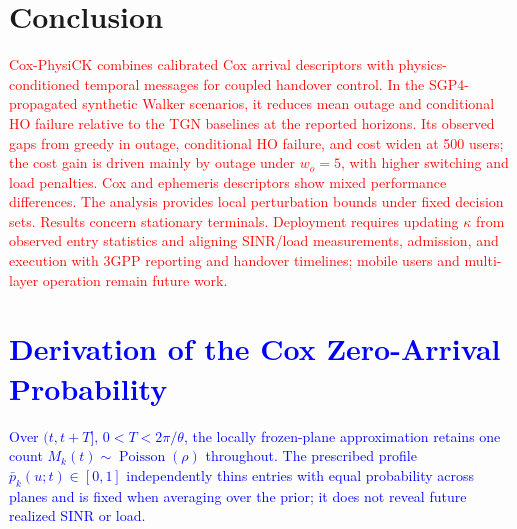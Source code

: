 \documentclass[10pt,letterpaper,journal]{IEEEtran}
\newcommand{\revnew}[1]{\textcolor{red}{#1}}
\begin{document}
\noindent\begin{minipage}{\columnwidth}
\section{Conclusion}
\label{sec:conclusion}
\revnew{Cox-PhysiCK combines calibrated Cox arrival descriptors with physics-conditioned temporal messages for coupled handover control. In the SGP4-propagated synthetic Walker scenarios, it reduces mean outage and conditional HO failure relative to the TGN baselines at the reported horizons. Its observed gaps from greedy in outage, conditional HO failure, and cost widen at 500 users; the cost gain is driven mainly by outage under $w_o=5$, with higher switching and load penalties. Cox and ephemeris descriptors show mixed performance differences. The analysis provides local perturbation bounds under fixed decision sets. Results concern stationary terminals. Deployment requires updating $\kappa$ from observed entry statistics and aligning SINR/load measurements, admission, and execution with 3GPP reporting and handover timelines; mobile users and multi-layer operation remain future work.}


\end{minipage}
\appendices

\section{\textcolor{blue}{Derivation of the Cox Zero-Arrival Probability}}
\label{app:cox_risk}

\textcolor{blue}{Over $(t,t+T]$, $0<T<2\pi/\theta$, the locally frozen-plane approximation retains one count $M_k(t)\sim\operatorname{Poisson}(\rho)$ throughout. The prescribed profile $\bar p_k(u;t)\in[0,1]$ independently thins entries with equal probability across planes and is fixed when averaging over the prior; it does not reveal future realized SINR or load.}
\end{document}
